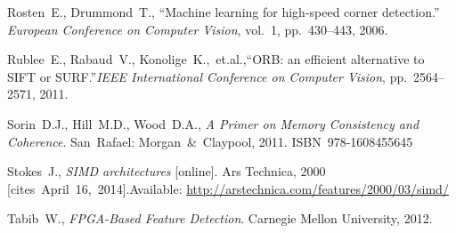 {\begin{thebibliography}{99}
			Rosten~E., Drummond~T.,
			``Machine learning for high-speed corner detection.''
			\textit{European Conference on Computer Vision}, vol.~1, pp.~430--443,
			2006.
		
			Rublee~E., Rabaud~V., Konolige~K.,~et.al.,\linebreak[1]
			``ORB: an efficient alternative to SIFT or SURF.''\linebreak[1]
			\textit{IEEE International Conference on Computer Vision},
			pp.~2564--2571, 2011.
		
			Sorin~D.J., Hill~M.D., Wood~D.A.,
			\textit{A Primer on Memory Consistency and Coherence}.
			San~Rafael: Morgan~\&~Claypool, 2011. ISBN~978-1608455645
		
			Stokes~J.,
			\textit{SIMD architectures} [online]. Ars Technica, 2000 %
			[cites~April~16,~2014].\linebreak[1]
			Available: \url{http://arstechnica.com/features/2000/03/simd/}
		
			Tabib~W.,
			\textit{FPGA-Based Feature Detection}.
			Carnegie Mellon University, 2012.
		
		
		
		
		
		
		
		

\end{thebibliography}}
